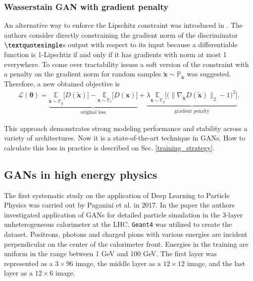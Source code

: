 \documentclass{webofc}
\begin{document}
\subsubsection{Wasserstain GAN with gradient penalty}
An alternative way to enforce the Lipschitz constraint was introduced in \cite{gulrajani2017improved}. The authors consider directly constraining the gradient norm of the discriminator$\textquotesingle$s output with respect to its input because a differentiable function is 1-Lipschtiz if and only if it has gradients with norm at most 1 everywhere. To come over tractability issues a soft version of the constraint with a penalty on the gradient norm for random samples $\tilde{\textbf{x}} \sim \mathbb{P}_{\tilde{\textbf{x}}}$ was suggested. Therefore, a new obtained objective is 
\begin{equation} \label{gpwgan-loss}
\begin{gathered}
\mathcal{L}(\bm{\theta}) =
\underbrace{ \underset{\tilde{\textbf{x}} \sim \mathbb{P}_g}{\mathbb{E}}  \Big[D(\tilde{\textbf{x}})\Big] - \underset{\textbf{x} \sim \mathbb{P}_r}{\mathbb{E}} \Big[D(\textbf{x})\Big]}_{\text{original loss}} + 
\underbrace{ \lambda \underset{\textbf{x} \sim \mathbb{P}_g}{\mathbb{E}} \Big[\big(\|\nabla_{\tilde{\textbf{x}}} D(\tilde{\textbf{x}})\|_2 - 1\big)^2 \Big]}_{\text{gradient penalty}}.
\end{gathered}
\end{equation}

This approach demonstrates strong modeling performance and stability across a variety of architectures.  Now it is a state-of-the-art technique in GANs. 
How to calculate this loss in practice is described on Sec. \ref{training_strategy}.

\subsection{GANs in high energy physics}
The first systematic study on the application of Deep Learning to Particle Physics was carried out by Paganini et al. in 2017. In the paper \cite{paganini2017calogan} the authors investigated application of GANs for detailed particle simulation in the 3-layer unheterogeneous calorimeter at the LHC. \texttt{Geant4} was utilized to create the dataset. Positrons, photons and charged pions with various energies are incident perpendicular on the center of the calorimeter front. Energies in the training are uniform in the range between 1 GeV and 100 GeV.  The first layer was represented as a $3 \times 96$ image, the middle layer as a $12 \times 12$ image, and the last layer as a $12 \times 6$ image. 
\end{document}
